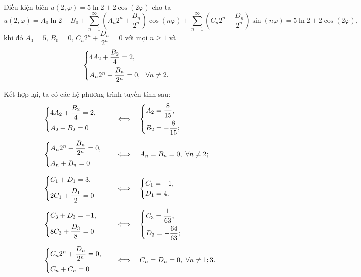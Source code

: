 \documentclass[10pt, a4paper]{article}
\begin{document}
	Điều kiện biên $u(2,\varphi)=5\ln2+2\cos(2\varphi)$ cho ta $$u(2,\varphi)=A_0\ln 2+B_0+\displaystyle\sum_{n=1}^\infty\left(A_n2^n+\dfrac{B_n}{2^n}\right)\cos(n\varphi)+\displaystyle\sum_{n=1}^\infty\left(C_n2^n+\dfrac{D_n}{2^n}\right)\sin(n\varphi)=5\ln2+2\cos(2\varphi),$$
	khi đó $A_0=5,\,B_0=0,\,C_n2^n+\dfrac{D_n}{2^n}=0$ với mọi $n\ge1$ và $$\begin{cases}
		4A_2+\dfrac{B_2}{4}=2,\\
		\noalign{\vskip5pt}
		A_n2^n+\dfrac{B_n}{2^n}=0,~~\forall n\ne2.
	\end{cases}$$
	
	Kết hợp lại, ta có các hệ phương trình tuyến tính sau: $$\begin{array}{lll}
		\begin{cases}
			4A_2+\dfrac{B_2}{4}=2,\\
			\noalign{\vskip5pt}
			A_2+B_2=0
		\end{cases}&\iff&\begin{cases}
			A_2=\dfrac{8}{15},\\
			\noalign{\vskip5pt}
			B_2=-\dfrac{8}{15};
		\end{cases}\\\noalign{\vskip9pt}
		\begin{cases}
			A_n2^n+\dfrac{B_n}{2^n}=0,\\
			\noalign{\vskip5pt}
			A_n+B_n=0
		\end{cases}&\iff& A_n=B_n=0,~\forall n\ne2;\\\noalign{\vskip9pt}
		\begin{cases}
			C_1+D_1=3,\\
			\noalign{\vskip5pt}
			2C_1+\dfrac{D_1}{2}=0
		\end{cases}&\iff&\begin{cases}
			C_1=-1,\\
			D_1=4;
		\end{cases}\\\noalign{\vskip9pt}
		\begin{cases}
			C_3+D_3=-1,\\
			\noalign{\vskip5pt}
			8C_3+\dfrac{D_3}{8}=0
		\end{cases}&\iff&\begin{cases}
			C_3=\dfrac{1}{63},\\
			\noalign{\vskip5pt}
			D_3=-\dfrac{64}{63};
		\end{cases}\\\noalign{\vskip9pt}
		\begin{cases}
			C_n2^n+\dfrac{D_n}{2^n}=0,\\
			\noalign{\vskip5pt}
			C_n+C_n=0
		\end{cases}&\iff& C_n=D_n=0,~\forall n\ne1;3.
	\end{array}$$
	
\end{document}
